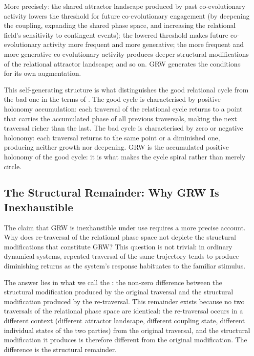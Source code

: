 \begin{center}
\begin{tikzpicture}[every node/.style={draw=none}]
\end{tikzpicture}
\end{center}

More precisely: the shared attractor landscape produced by past co-evolutionary activity lowers the threshold for future co-evolutionary engagement (by deepening the coupling, expanding the shared phase space, and increasing the relational field's sensitivity to contingent events); the lowered threshold makes future co-evolutionary activity more frequent and more generative; the more frequent and more generative co-evolutionary activity produces deeper structural modifications of the relational attractor landscape; and so on. GRW generates the conditions for its own augmentation.

This self-generating structure is what distinguishes the good relational cycle from the bad one in the terms of  \parencite{paperix}. The good cycle is characterised by positive holonomy accumulation: each traversal of the relational cycle returns to a point that carries the accumulated phase of all previous traversals, making the next traversal richer than the last. The bad cycle is characterised by zero or negative holonomy: each traversal returns to the same point or a diminished one, producing neither growth nor deepening. GRW is the accumulated positive holonomy of the good cycle: it is what makes the cycle spiral rather than merely circle.

\subsection{The Structural Remainder: Why GRW Is Inexhaustible}
\label{p15:subsec:remainder}

\noindent
The claim that GRW is inexhaustible under use requires a more precise account. Why does re-traversal of the relational phase space not deplete the structural modifications that constitute GRW? This question is not trivial: in ordinary dynamical systems, repeated traversal of the same trajectory tends to produce diminishing returns as the system's response habituates to the familiar stimulus.

The answer lies in what we call the : the non-zero difference between the structural modification produced by the original traversal and the structural modification produced by the re-traversal. This remainder exists because no two traversals of the relational phase space are identical: the re-traversal occurs in a different context (different attractor landscape, different coupling state, different individual states of the two parties) from the original traversal, and the structural modification it produces is therefore different from the original modification. The difference is the structural remainder.


